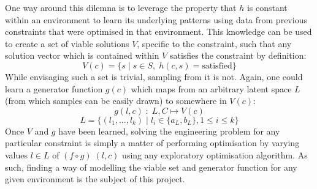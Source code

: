 \documentclass[../../main.tex]{subfiles}
\begin{document}
One way around this dilemna is to leverage the property that $h$ is constant within an environment to learn its underlying patterns using data from previous constraints that were optimised in that environment.
This knowledge can be used to create a set of viable solutions $V$, specific to the constraint, such that any solution vector which is contained within $V$ satisfies the constraint by definition:
\begin{equation}
    V(c)=\{s\;|\;s\in S,\;h(c,s)=\text{satisfied}\}
\end{equation}
While envisaging such a set is trivial, sampling from it is not.
Again, one could learn a generator function $g(c)$ which maps from an arbitrary latent space $L$ (from which samples can be easily drawn) to somewhere in $V(c)$:
\begin{equation}
    g(l,c)\;:\;L,C\mapsto V(c)
\end{equation}
\begin{equation}
    L=\{(l_1,...,l_k)\;|\;l_i\in\{a_L,b_L\},1\le i\le k\}
\end{equation}
Once $V$ and $g$ have been learned, solving the engineering problem for any particular constraint is simply a matter of performing optimisation by varying values $l\in L$ of $(f\circ g)\;(l,c)$ using any exploratory optimisation algorithm.
As such, finding a way of modelling the viable set and generator function for any given environment is the subject of this project.
\end{document}
